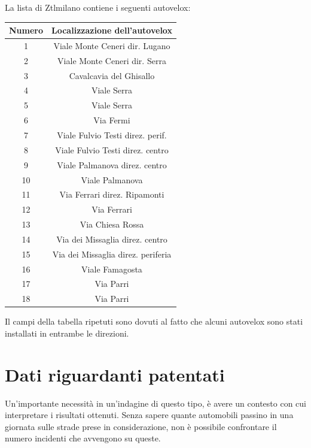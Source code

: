 \documentclass[a4paper,12pt]{report}
\begin{document}
La lista di Ztlmilano contiene i seguenti autovelox: 

\begin{center}
    \def\arraystretch{1.5}%
    \begin{tabular}{ |c|c| } 
    \hline
    Numero & Localizzazione dell'autovelox \\ 
    \hline
    \rowcolor{TableGray}
    1   &   Viale Monte Ceneri  dir. Lugano\\
    2   &   Viale Monte Ceneri dir. Serra\\
    \rowcolor{TableGray}
    3   &   Cavalcavia del Ghisallo\\
    4   &   Viale Serra \\
    \rowcolor{TableGray}
    5   &   Viale Serra\\
    6   &   Via Fermi\\
    \rowcolor{TableGray}
    7   &   Viale Fulvio Testi direz. perif.\\
    8   &   Viale Fulvio Testi direz. centro\\
    \rowcolor{TableGray}
    9   &   Viale Palmanova  direz. centro\\
    10  &   Viale Palmanova\\
    \rowcolor{TableGray}
    11  &   Via Ferrari direz. Ripamonti\\
    12  &   Via Ferrari\\
    \rowcolor{TableGray}
    13  &   Via Chiesa Rossa\\
    14  &   Via dei Missaglia direz. centro\\
    \rowcolor{TableGray}
    15  &   Via dei Missaglia direz. periferia\\
    16  &   Viale Famagosta\\
    \rowcolor{TableGray}
    17  &   Via Parri\\
    18  &   Via Parri\\
    \hline
    \end{tabular}
    \label{ztl-milano}
\end{center}

Il campi della tabella ripetuti sono dovuti al fatto che alcuni autovelox sono stati 
installati in entrambe le direzioni. 

\section{Dati riguardanti patentati}

Un'importante necessità in un'indagine di questo tipo, è avere un contesto con cui 
interpretare i risultati ottenuti. 
Senza sapere quante automobili passino in una giornata sulle strade prese in considerazione, 
non è possibile confrontare il numero incidenti che avvengono su queste. 
\end{document}
